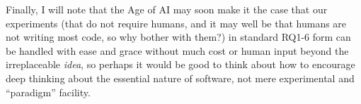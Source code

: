 \documentclass[sigplan,screen]{acmart}
\begin{document}
              Finally, I will note that the Age of AI may soon make it
              the case that our experiments (that do not require
              humans, and it may well be that humans are not writing
              most code, so why bother with them?) in standard RQ1-6
              form can be handled with ease and grace without much
              cost or human input beyond the irreplaceable \emph{idea}, so perhaps it would
              be good to think about how to encourage deep thinking
              about the essential nature of software, not mere
              experimental and ``paradigm'' facility.



\end{document}
